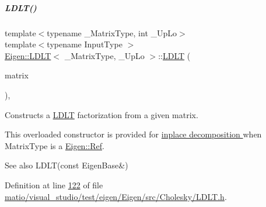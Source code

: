 \mbox{\label{group___cholesky___module_adf853d6cbbc49f3535a44439bca344d9}} 
\subparagraph{\texorpdfstring{L\+D\+L\+T()}{LDLT()}\hspace{0.1cm}{\footnotesize\ttfamily [8/8]}}
{\footnotesize\ttfamily template$<$typename \+\_\+\+Matrix\+Type, int \+\_\+\+Up\+Lo$>$ \\
template$<$typename Input\+Type $>$ \\
\hyperlink{group___cholesky___module_class_eigen_1_1_l_d_l_t}{Eigen\+::\+L\+D\+LT}$<$ \+\_\+\+Matrix\+Type, \+\_\+\+Up\+Lo $>$\+::\hyperlink{group___cholesky___module_class_eigen_1_1_l_d_l_t}{L\+D\+LT} (\begin{DoxyParamCaption}\item[{\hyperlink{group___core___module_struct_eigen_1_1_eigen_base}{Eigen\+Base}$<$ Input\+Type $>$ \&}]{matrix }\end{DoxyParamCaption})\hspace{0.3cm}{\ttfamily [inline]}, {\ttfamily [explicit]}}



Constructs a \hyperlink{group___cholesky___module_class_eigen_1_1_l_d_l_t}{L\+D\+LT} factorization from a given matrix. 

This overloaded constructor is provided for \hyperlink{group___inplace_decomposition}{inplace decomposition } when {\ttfamily Matrix\+Type} is a \hyperlink{group___core___module_class_eigen_1_1_ref}{Eigen\+::\+Ref}.

\begin{DoxySeeAlso}{See also}
L\+D\+L\+T(const Eigen\+Base\&) 
\end{DoxySeeAlso}


Definition at line \hyperlink{matio_2visual__studio_2test_2eigen_2_eigen_2src_2_cholesky_2_l_d_l_t_8h_source_l00122}{122} of file \hyperlink{matio_2visual__studio_2test_2eigen_2_eigen_2src_2_cholesky_2_l_d_l_t_8h_source}{matio/visual\+\_\+studio/test/eigen/\+Eigen/src/\+Cholesky/\+L\+D\+L\+T.\+h}.



